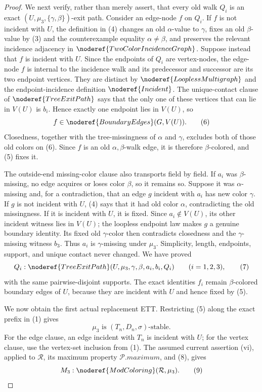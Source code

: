 \begin{proof}
We next verify, rather than merely assert, that every old walk \(Q_i\)
is an exact \((U,\mu_3,\{\gamma,\beta\})\)-exit path.  Consider an
edge-node \(f\) on \(Q_i\).  If \(f\) is not incident with \(U\), the
definition in (4) changes an old \(\alpha\)-value to \(\gamma\), fixes
an old \(\beta\)-value by (3) and the counterexample equality
\(\alpha\ne\beta\), and preserves the relevant incidence adjacency in
\(\noderef{TwoColorIncidenceGraph}\).  Suppose instead that \(f\) is
incident with \(U\).  Since the endpoints of \(Q_i\) are vertex-nodes,
the edge-node \(f\) is internal to the incidence walk and its predecessor
and successor are its two endpoint vertices.  They are distinct by
\(\noderef{LooplessMultigraph}\) and the endpoint-incidence definition
\(\noderef{Incident}\).  The unique-contact clause of
\(\noderef{TreeExitPath}\) says that the only one of these vertices that
can lie in \(V(U)\) is \(b_i\).  Hence exactly one endpoint lies in
\(V(U)\), so
\[
                       f\in\noderef{BoundaryEdges}(G,V(U)).   \tag{6}
\]
Closedness, together with the tree-missingness of \(\alpha\) and
\(\gamma\), excludes both of those old colors on (6).  Since \(f\) is
an old \(\alpha,\beta\)-walk edge, it is therefore \(\beta\)-colored,
and (5) fixes it.

The outside-end missing-color clause also transports field by field.
If \(a_i\) was \(\beta\)-missing, no edge acquires or loses color
\(\beta\), so it remains so.  Suppose it was \(\alpha\)-missing and,
for a contradiction, that an edge \(g\) incident with \(a_i\) has new
color \(\gamma\).  If \(g\) is not incident with \(U\), (4) says that
it had old color \(\alpha\), contradicting the old missingness.  If it
is incident with \(U\), it is fixed.  Since \(a_i\notin V(U)\), its
other incident witness lies in \(V(U)\); the loopless endpoint law makes
\(g\) a genuine boundary identity.  Its fixed old \(\gamma\)-color then
contradicts closedness and the \(\gamma\)-missing witness \(b_3\).
Thus \(a_i\) is \(\gamma\)-missing under \(\mu_3\).  Simplicity,
length, endpoints, support, and unique contact never changed.  We have
proved
\[
 Q_i:\noderef{TreeExitPath}(U,\mu_3,\gamma,\beta,a_i,b_i,Q_i)
                    \qquad(i=1,2,3),                         \tag{7}
\]
with the same pairwise-disjoint supports.  The exact identities
\(f_i\) remain \(\beta\)-colored boundary edges of \(U\), because they
are incident with \(U\) and hence fixed by (5).

We now obtain the first actual replacement ETT.  Restricting (5) along
the exact prefix in (1) gives
\[
                 \mu_3\text{ is }(T_n,D_n,\sigma)\text{-stable}. \tag{8}
\]
For the edge clause, an edge incident with \(T_n\) is incident with
\(U\); for the vertex clause, use the vertex-set inclusion from (1).
The assumed current assertion (vi), applied to \(\mathcal R\), its
maximum property \(\mathcal P.\mathit{maximum}\), and (8), gives
\[
                        M_3:\noderef{ModColoring}(\mathcal R,\mu_3).
                                                                    \tag{9}
\]


\end{proof}
